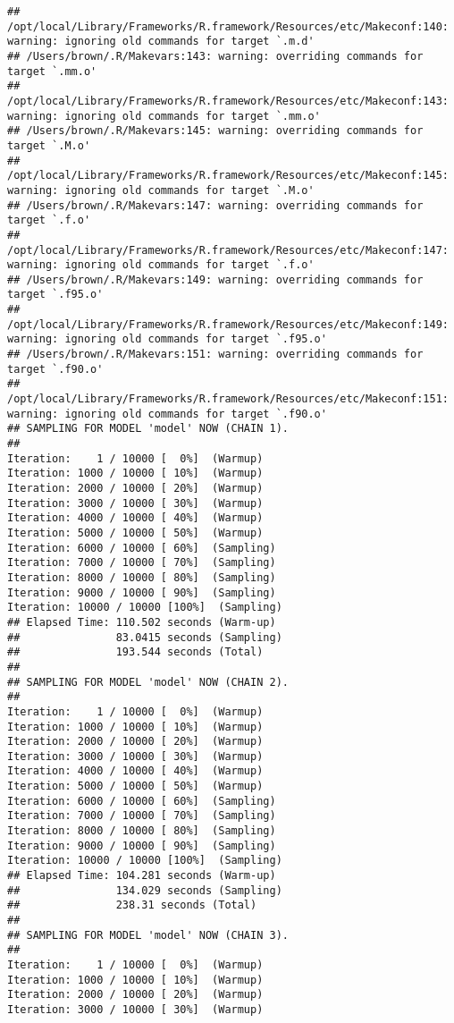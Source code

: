 \documentclass{article}\usepackage[]{graphicx}\usepackage[]{color}
\makeatletter
\newenvironment{kframe}{%
 \def\at@end@of@kframe{}%
 \ifinner\ifhmode%
  \def\at@end@of@kframe{\end{minipage}}%
  \begin{minipage}{\columnwidth}%
 \fi\fi%
 \def\FrameCommand##1{\hskip\@totalleftmargin \hskip-\fboxsep
 \colorbox{shadecolor}{##1}\hskip-\fboxsep
     \hskip-\linewidth \hskip-\@totalleftmargin \hskip\columnwidth}%
 \MakeFramed {\advance\hsize-\width
   \@totalleftmargin\z@ \linewidth\hsize
   \@setminipage}}%
 {\par\unskip\endMakeFramed%
 \at@end@of@kframe}
\newenvironment{knitrout}{}{} %
\makeatother
\begin{document}
\begin{knitrout}
\begin{kframe}
\begin{verbatim}
## /opt/local/Library/Frameworks/R.framework/Resources/etc/Makeconf:140: warning: ignoring old commands for target `.m.d'
## /Users/brown/.R/Makevars:143: warning: overriding commands for target `.mm.o'
## /opt/local/Library/Frameworks/R.framework/Resources/etc/Makeconf:143: warning: ignoring old commands for target `.mm.o'
## /Users/brown/.R/Makevars:145: warning: overriding commands for target `.M.o'
## /opt/local/Library/Frameworks/R.framework/Resources/etc/Makeconf:145: warning: ignoring old commands for target `.M.o'
## /Users/brown/.R/Makevars:147: warning: overriding commands for target `.f.o'
## /opt/local/Library/Frameworks/R.framework/Resources/etc/Makeconf:147: warning: ignoring old commands for target `.f.o'
## /Users/brown/.R/Makevars:149: warning: overriding commands for target `.f95.o'
## /opt/local/Library/Frameworks/R.framework/Resources/etc/Makeconf:149: warning: ignoring old commands for target `.f95.o'
## /Users/brown/.R/Makevars:151: warning: overriding commands for target `.f90.o'
## /opt/local/Library/Frameworks/R.framework/Resources/etc/Makeconf:151: warning: ignoring old commands for target `.f90.o'
## SAMPLING FOR MODEL 'model' NOW (CHAIN 1).
## 
Iteration:    1 / 10000 [  0%]  (Warmup)
Iteration: 1000 / 10000 [ 10%]  (Warmup)
Iteration: 2000 / 10000 [ 20%]  (Warmup)
Iteration: 3000 / 10000 [ 30%]  (Warmup)
Iteration: 4000 / 10000 [ 40%]  (Warmup)
Iteration: 5000 / 10000 [ 50%]  (Warmup)
Iteration: 6000 / 10000 [ 60%]  (Sampling)
Iteration: 7000 / 10000 [ 70%]  (Sampling)
Iteration: 8000 / 10000 [ 80%]  (Sampling)
Iteration: 9000 / 10000 [ 90%]  (Sampling)
Iteration: 10000 / 10000 [100%]  (Sampling)
## Elapsed Time: 110.502 seconds (Warm-up)
##               83.0415 seconds (Sampling)
##               193.544 seconds (Total)
## 
## SAMPLING FOR MODEL 'model' NOW (CHAIN 2).
## 
Iteration:    1 / 10000 [  0%]  (Warmup)
Iteration: 1000 / 10000 [ 10%]  (Warmup)
Iteration: 2000 / 10000 [ 20%]  (Warmup)
Iteration: 3000 / 10000 [ 30%]  (Warmup)
Iteration: 4000 / 10000 [ 40%]  (Warmup)
Iteration: 5000 / 10000 [ 50%]  (Warmup)
Iteration: 6000 / 10000 [ 60%]  (Sampling)
Iteration: 7000 / 10000 [ 70%]  (Sampling)
Iteration: 8000 / 10000 [ 80%]  (Sampling)
Iteration: 9000 / 10000 [ 90%]  (Sampling)
Iteration: 10000 / 10000 [100%]  (Sampling)
## Elapsed Time: 104.281 seconds (Warm-up)
##               134.029 seconds (Sampling)
##               238.31 seconds (Total)
## 
## SAMPLING FOR MODEL 'model' NOW (CHAIN 3).
## 
Iteration:    1 / 10000 [  0%]  (Warmup)
Iteration: 1000 / 10000 [ 10%]  (Warmup)
Iteration: 2000 / 10000 [ 20%]  (Warmup)
Iteration: 3000 / 10000 [ 30%]  (Warmup)

\end{verbatim}
\end{kframe}
\end{knitrout}
\end{document}
